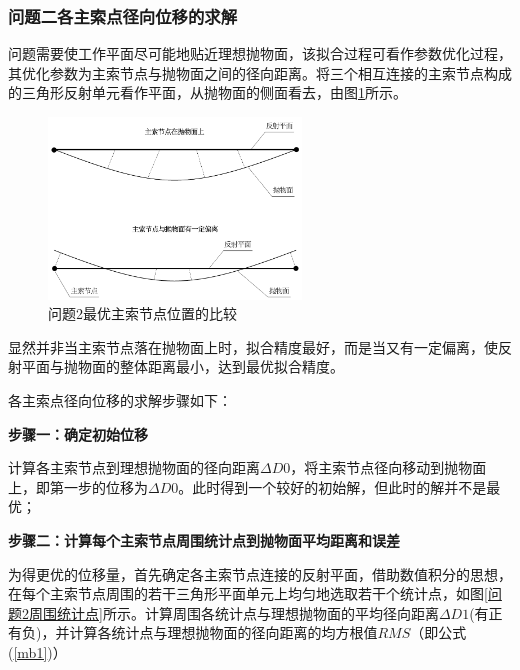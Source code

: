 \documentclass[withoutpreface,bwprint]{cumcmthesis} %
\begin{document}
	\subsubsection{问题二各主索点径向位移的求解}
		问题需要使工作平面尽可能地贴近理想抛物面，该拟合过程可看作参数优化过程，其优化参数为主索节点与抛物面之间的径向距离。将三个相互连接的主索节点构成的三角形反射单元看作平面，从抛物面的侧面看去，由图\ref{问题2最优主索节点位置的比较}所示。
			\begin{figure}[!htp]
			\centering
			\includegraphics[width=0.6\textwidth]{问题2最优主索节点位置的比较}
			\caption{问题2最优主索节点位置的比较}
			\label{问题2最优主索节点位置的比较}
		\end{figure}
		显然并非当主索节点落在抛物面上时，拟合精度最好，而是当又有一定偏离，使反射平面与抛物面的整体距离最小，达到最优拟合精度。
		
		各主索点径向位移的求解步骤如下：
		
		\textbf{步骤一：确定初始位移}
		
		计算各主索节点到理想抛物面的径向距离$\Delta D0$，将主索节点径向移动到抛物面上，即第一步的位移为$\Delta D0$。此时得到一个较好的初始解，但此时的解并不是最优；
		
		\textbf{步骤二：计算每个主索节点周围统计点到抛物面平均距离和误差}
		
		为得更优的位移量，首先确定各主索节点连接的反射平面，借助数值积分的思想，在每个主索节点周围的若干三角形平面单元上均匀地选取若干个统计点，如图\ref{问题2周围统计点}所示。计算周围各统计点与理想抛物面的平均径向距离$\Delta D1$(有正有负)，并计算各统计点与理想抛物面的径向距离的均方根值$RMS$（即公式(\ref{mb1})）
		
\end{document}
